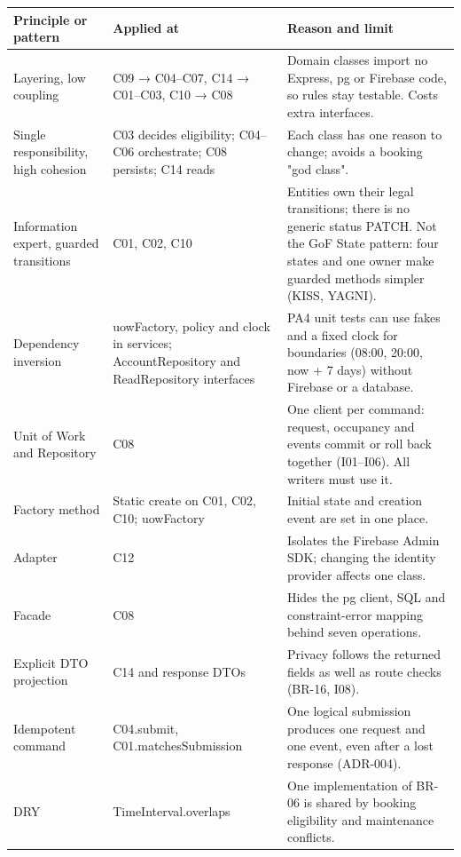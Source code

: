\small
\setlength{\tabcolsep}{3pt}
\renewcommand{\arraystretch}{1.12}
\begin{longtable}{|p{}|p{}|p{}|}
\hline
\textbf{Principle or pattern} & \textbf{Applied at} & \textbf{Reason and limit} \\ \hline
\endfirsthead \hline
Layering, low coupling & C09 → C04–C07, C14 → C01–C03, C10 → C08 & Domain classes import no Express, pg or Firebase code, so rules stay testable. Costs extra interfaces. \\ \hline
Single responsibility, high cohesion & C03 decides eligibility; C04–C06 orchestrate; C08 persists; C14 reads & Each class has one reason to change; avoids a booking "god class". \\ \hline
Information expert, guarded transitions & C01, C02, C10 & Entities own their legal transitions; there is no generic status PATCH. Not the GoF State pattern: four states and one owner make guarded methods simpler (KISS, YAGNI). \\ \hline
Dependency inversion & uowFactory, policy and clock in services; AccountRepository and ReadRepository interfaces & PA4 unit tests can use fakes and a fixed clock for boundaries (08:00, 20:00, now + 7 days) without Firebase or a database. \\ \hline
Unit of Work and Repository & C08 & One client per command: request, occupancy and events commit or roll back together (I01–I06). All writers must use it. \\ \hline
Factory method & Static create on C01, C02, C10; uowFactory & Initial state and creation event are set in one place. \\ \hline
Adapter & C12 & Isolates the Firebase Admin SDK; changing the identity provider affects one class. \\ \hline
Facade & C08 & Hides the pg client, SQL and constraint-error mapping behind seven operations. \\ \hline
Explicit DTO projection & C14 and response DTOs & Privacy follows the returned fields as well as route checks (BR-16, I08). \\ \hline
Idempotent command & C04.submit, C01.matchesSubmission & One logical submission produces one request and one event, even after a lost response (ADR-004). \\ \hline
DRY & TimeInterval.overlaps & One implementation of BR-06 is shared by booking eligibility and maintenance conflicts. \\ \hline
\end{longtable}
\normalsize